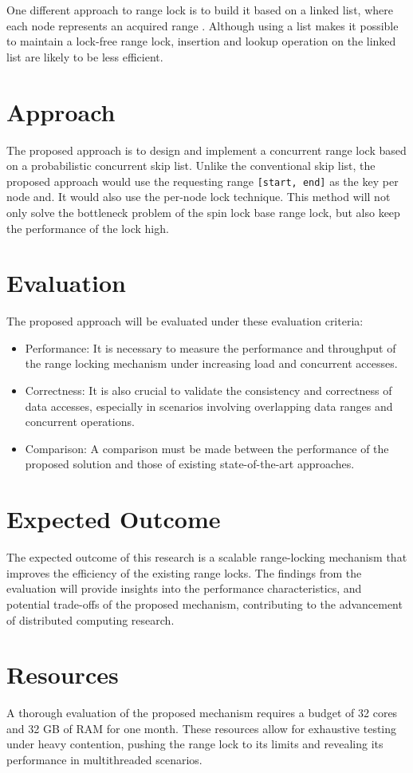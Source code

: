 One different approach to range lock is to build it based on a linked list, where each node represents an acquired range \parencite{scalableRangeLock2020}. Although using a list makes it possible to maintain a lock-free range lock, insertion and lookup operation on the linked list are likely to be less efficient.

\newpage

\section{Approach}
The proposed approach is to design and implement a concurrent range lock based on a probabilistic concurrent skip list. Unlike the conventional skip list, the proposed approach would use the requesting range \texttt{[start, end]} as the key per node and. It would also use the per-node lock technique. This method will not only solve the bottleneck problem of the spin lock base range lock, but also keep the performance of the lock high.

\section{Evaluation}
The proposed approach will be evaluated under these evaluation criteria:
\begin{itemize}
    \item Performance: It is necessary to measure the performance and throughput of the range locking mechanism under increasing load and concurrent accesses.
    \item Correctness: It is also crucial to validate the consistency and correctness of data accesses, especially in scenarios involving overlapping data ranges and concurrent operations.
    \item Comparison: A comparison must be made between the performance of the proposed solution and those of existing state-of-the-art approaches.
\end{itemize}

\section{Expected Outcome}
The expected outcome of this research is a scalable range-locking mechanism that improves the efficiency of the existing range locks. The findings from the evaluation will provide insights into the performance characteristics, and potential trade-offs of the proposed mechanism, contributing to the advancement of distributed computing research.

\section{Resources}
A thorough evaluation of the proposed mechanism requires a budget of 32 cores and 32 GB of RAM for one month. These resources allow for exhaustive testing under heavy contention, pushing the range lock to its limits and revealing its performance in multithreaded scenarios.